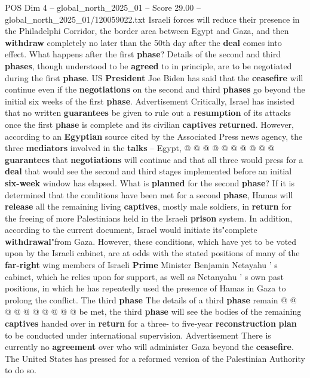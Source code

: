 \begin{textsample}{POS Dim 4 – global\_north\_2025\_01 – Score 29.00 – global\_north\_2025\_01/120059022.txt}
Israeli forces will reduce their presence in the Philadelphi Corridor, the border area between Egypt and Gaza, and then \textbf{withdraw} completely no later than the 50th day after the \textbf{deal} comes into effect.
What happens after the first \textbf{phase}?
Details of the second and third \textbf{phases}, though understood to be \textbf{agreed} to in principle, are to be negotiated during the first \textbf{phase}.
US \textbf{President} Joe Biden has said that the \textbf{ceasefire} will continue even if the \textbf{negotiations} on the second and third \textbf{phases} go beyond the initial six weeks of the first \textbf{phase}.
Advertisement Critically, Israel has insisted that no written \textbf{guarantees} be given to rule out a \textbf{resumption} of its attacks once the first \textbf{phase} is complete and its civilian \textbf{captives} \textbf{returned}.
However, according to an \textbf{Egyptian} source cited by the Associated Press news agency, the three \textbf{mediators} involved in the \textbf{talks} -- Egypt, @ @ @ @ @ @ @ @ @ @ \textbf{guarantees} that \textbf{negotiations} will continue and that all three would press for a \textbf{deal} that would see the second and third stages implemented before an initial \textbf{six-week} window has elapsed.
What is \textbf{planned} for the second \textbf{phase}?
If it is determined that the conditions have been met for a second \textbf{phase}, Hamas will \textbf{release} all the remaining living \textbf{captives}, mostly male soldiers, in \textbf{return} for the freeing of more Palestinians held in the Israeli \textbf{prison} system.
In addition, according to the current document, Israel would initiate its"complete \textbf{withdrawal}"from Gaza.
However, these conditions, which have yet to be voted upon by the Israeli cabinet, are at odds with the stated positions of many of the \textbf{far-right} wing members of Israeli \textbf{Prime} Minister Benjamin Netayahu ' s cabinet, which he relies upon for support, as well as Netanyahu ' s own past positions, in which he has repeatedly used the presence of Hamas in Gaza to prolong the conflict.
The third \textbf{phase} The details of a third \textbf{phase} remain @ @ @ @ @ @ @ @ @ @ be met, the third \textbf{phase} will see the bodies of the remaining \textbf{captives} handed over in \textbf{return} for a three- to five-year \textbf{reconstruction} \textbf{plan} to be conducted under international supervision.
Advertisement There is currently no \textbf{agreement} over who will administer Gaza beyond the \textbf{ceasefire}.
The United States has pressed for a reformed version of the Palestinian Authority to do so.

\end{textsample}
